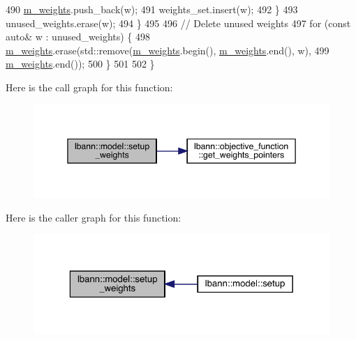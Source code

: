 \begin{DoxyCode}
490       \hyperlink{classlbann_1_1model_aaf9adefe4497d90bf5bc2567e71bfb00}{m\_weights}.push\_back(w);
491       weights\_set.insert(w);
492     \}
493     unused\_weights.erase(w);
494   \}
495 
496   \textcolor{comment}{// Delete unused weights}
497   \textcolor{keywordflow}{for} (\textcolor{keyword}{const} \textcolor{keyword}{auto}& w : unused\_weights) \{
498     \hyperlink{classlbann_1_1model_aaf9adefe4497d90bf5bc2567e71bfb00}{m\_weights}.erase(std::remove(\hyperlink{classlbann_1_1model_aaf9adefe4497d90bf5bc2567e71bfb00}{m\_weights}.begin(), \hyperlink{classlbann_1_1model_aaf9adefe4497d90bf5bc2567e71bfb00}{m\_weights}.end(), w),
499                     \hyperlink{classlbann_1_1model_aaf9adefe4497d90bf5bc2567e71bfb00}{m\_weights}.end());
500   \}
501 
502 \}
\end{DoxyCode}
Here is the call graph for this function\+:\nopagebreak
\begin{figure}[H]
\begin{center}
\leavevmode
\includegraphics[width=345pt]{classlbann_1_1model_a582edc0f930e1594381ecc7922e91b08_cgraph}
\end{center}
\end{figure}
Here is the caller graph for this function\+:\nopagebreak
\begin{figure}[H]
\begin{center}
\leavevmode
\includegraphics[width=323pt]{classlbann_1_1model_a582edc0f930e1594381ecc7922e91b08_icgraph}
\end{center}
\end{figure}
\mbox{\label{classlbann_1_1model_a0824e757e4806fad77630d69926a8911}} 
